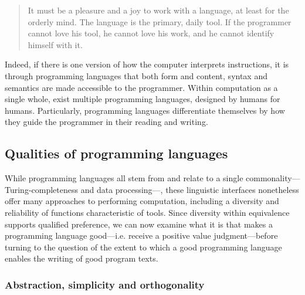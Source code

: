 \begin{quote}
  It must be a pleasure and a joy to work with a language, at least for the orderly mind. The language is the primary, daily tool. If the programmer cannot love his tool, he cannot love his work, and he cannot identify himself with it. \citep{wirth_essence_2003}
\end{quote}

Indeed, if there is one version of how the computer interprets instructions, it is through programming languages that both form and content, syntax and semantics are made accessible to the programmer. Within computation as a single whole, exist multiple programming languages, designed by humans for humans. Particularly, programming languages differentiate themselves by how they guide the programmer in their reading and writing.

\subsection{Qualities of programming languages}
\label{subsec:qualities-programming-languages}

While programming languages all stem from and relate to a single commonality—Turing-completeness and data processing—, these linguistic interfaces nonetheless offer many approaches to performing computation, including a diversity and reliability of functions characteristic of tools. Since diversity within equivalence supports qualified preference, we can now examine what it is that makes a programming language good—i.e. receive a positive value judgment—before turning to the question of the extent to which a good programming language enables the writing of good program texts.

\subsubsection{Abstraction, simplicity and orthogonality}
\label{subsubsec:abstraction-simplicity-orthogonality}

